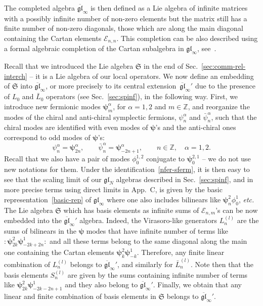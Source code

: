 \documentclass[11pt]{article}
\newcommand{\phim}{\phi^{1}}
\newcommand{\oZ}{\mathbb{Z}}
\newcommand{\interLie}{\mathfrak{S}}
\newcommand{\interch}{\interLie}
\newcommand{\interchalg}{\mathcal{S}}
\newcommand{\glinf}{\gl_{\infty}}
\newcommand{\bglinf}{\overline{\gl}_{\infty}}
\newcommand{\Egl}{\mathcal{E}}
\newcommand{\gl}{\mathfrak{gl}}
\newcommand{\nfer}{\boldsymbol{\psi}}
\newcommand{\nferp}{\nfer^2}
\newcommand{\nferm}{\nfer^1}
\newcommand{\enrg}{S}
\newcommand{\AppLim}{C}
\newcommand{\nord}[1]{\boldsymbol{\colon}\!\!{#1}\boldsymbol{\colon}\!\!}
\theoremstyle{definition}
\begin{document}
The completed algebra $\bglinf$ is then defined as a  Lie algebra of    infinite matrices with
 a possibly infinite number of non-zero elements but the matrix still has a finite number of non-zero diagonals, those which are along the main diagonal containing the Cartan elements $\Egl_{n,n}$. This completion can be also described using a formal algebraic completion of the Cartan subalgebra in $\glinf$, see~\cite{Kac-book}.

 \medskip

 Recall that we introduced the Lie algebra $\interch$ in the end of Sec.~\ref{sec:comm-rel-interch} -- it is a Lie algebra of our local operators.
  We now define an embedding of $\interch$ into $\bglinf$, or more precisely to its central extension~$\bglinf'$ due to the presence of $L_0$ and $\bar{L}_0$ operators (see Sec.~\ref{sec:spinf}), in the following way. First, we introduce new fermionic modes $\nfer^{\alpha}_m$, for $\alpha=1, 2$ and $m\in\oZ$, and reorganize the modes of the chiral and anti-chiral symplectic fermions, $\psi^{\alpha}_n$ and $\bar{\psi}^{\alpha}_n$, such that the chiral modes  are identified with even modes of $\nfer$'s and the anti-chiral ones correspond to odd modes of $\nfer$'s:
\begin{equation}\label{nfer-sferm}
\psi_n^{\alpha} = \nfer^{\alpha}_{2n},\qquad \bar{\psi}^{\alpha}_n =  \nfer^{\alpha}_{-2n+1},\qquad n\in\oZ, \quad \alpha=1,2.
\end{equation}
Recall that we also have a pair of modes $\phi^{1,2}_0$ conjugate to $\nfer^{2,1}_0$ -- we do not use new notations for them.
Under the identification~\eqref{nfer-sferm}, it is then easy to see that the scaling limit of our $\gl_N$ algebras described in Sec.~\ref{sec:spinf}, and in more precise terms using direct limits in App.~\AppLim, is given by the basic representation~\eqref{basic-rep} of $\glinf$ where one also includes bilinears like $\nfer^{2}_n\phim_0$, {\it etc.} The Lie algebra $\interch$ which has basis elements as infinite sums of $\Egl_{n,m}$'s can be now embedded into the $\bglinf'$ algebra. Indeed, the Virasoro-like generators $L^{(l)}_{n}$ are the sums of bilinears in the $\nfer$ modes that have infinite number of terms like $\nord{\nferp_{2k}\nferm_{-2k+2n}}$ and all these terms belong to the same diagonal along the main one containing the Cartan elements  $\nferp_{k}\nferm_{-k}$. Therefore, any finite linear combination of  $L^{(l)}_{n}$ belongs to $\bglinf'$, and similarly for $\bar{L}^{(l)}_{n}$. Note then that the basis elements $\enrg^{(l)}_n$ are given by the sums containing  infinite number of terms like $\nferp_{2k}\nferm_{-2k-2n+1}$ and they also belong to $\bglinf'$. Finally, we obtain that any linear and finite combination of basis elements in $\interch$ belongs to $\bglinf'$.
\end{document}
